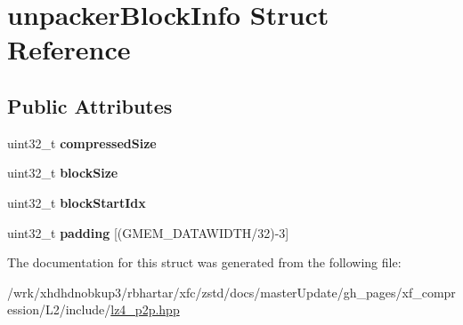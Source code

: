 \hypertarget{structunpackerBlockInfo}{\section{unpacker\-Block\-Info Struct Reference}
\label{structunpackerBlockInfo}
}
\subsection*{Public Attributes}
\begin{DoxyCompactItemize}
\item 
\hypertarget{structunpackerBlockInfo_a741d08923eefe7ae2979c3f511af6b57}{uint32\-\_\-t {\bfseries compressed\-Size}}\label{structunpackerBlockInfo_a741d08923eefe7ae2979c3f511af6b57}

\item 
\hypertarget{structunpackerBlockInfo_add12586bec0bc42280a57955c79836fc}{uint32\-\_\-t {\bfseries block\-Size}}\label{structunpackerBlockInfo_add12586bec0bc42280a57955c79836fc}

\item 
\hypertarget{structunpackerBlockInfo_ad1ff9bae24778d0633e2f0e6a47f1546}{uint32\-\_\-t {\bfseries block\-Start\-Idx}}\label{structunpackerBlockInfo_ad1ff9bae24778d0633e2f0e6a47f1546}

\item 
\hypertarget{structunpackerBlockInfo_a8898717738b6d1e46890f71340badd1d}{uint32\-\_\-t {\bfseries padding} \mbox{[}(G\-M\-E\-M\-\_\-\-D\-A\-T\-A\-W\-I\-D\-T\-H/32)-\/3\mbox{]}}\label{structunpackerBlockInfo_a8898717738b6d1e46890f71340badd1d}

\end{DoxyCompactItemize}


The documentation for this struct was generated from the following file\-:\begin{DoxyCompactItemize}
\item 
/wrk/xhdhdnobkup3/rbhartar/xfc/zstd/docs/master\-Update/gh\-\_\-pages/xf\-\_\-compression/\-L2/include/\hyperlink{lz4__p2p_8hpp}{lz4\-\_\-p2p.\-hpp}\end{DoxyCompactItemize}
